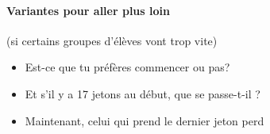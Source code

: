 \documentclass[12pt, a4paper]{article}
\begin{document}
\paragraph*{Variantes pour aller plus loin} (si certains groupes d'élèves vont trop vite)
\begin{itemize}
\item Est-ce que tu préfères commencer ou pas?
\item Et s'il y a 17 jetons au début, que se passe-t-il ?
\item Maintenant, celui qui prend le dernier jeton perd
\end{itemize}
\end{document}
